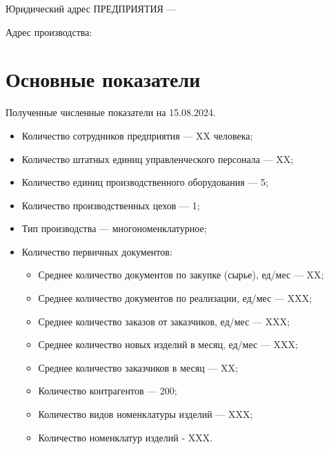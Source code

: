 Юридический адрес ПРЕДПРИЯТИЯ --- \CURADDRESS

Адрес производства: \ADDRESS



\section{Основные показатели}

Полученные численные показатели на 15.08.2024.

\begin{itemize}
\item Количество сотрудников предприятия --- XX человека;

\item Количество штатных единиц управленческого персонала --- XX;
\item Количество единиц производственного оборудования --- 5;
\item Количество производственных цехов --- 1;
\item Тип производства --- многономенклатурное;

\item Количество первичных документов:
\begin{itemize}
\item Среднее количество документов по закупке (сырье), ед/мес — XX;
\item Среднее количество документов по реализации, ед/мес — XXX;
\item Среднее количество заказов от заказчиков, ед/мес — XXX;
\item Среднее количество новых изделий в месяц, ед/мес — XXX;
\item Среднее количество заказчиков в месяц — XX;
\item Количество контрагентов — 200;
\item Количество видов номенклатуры изделий — XXX;
\item Количество номенклатур изделий - XXX.


\end{itemize}

\end{itemize}












% 
